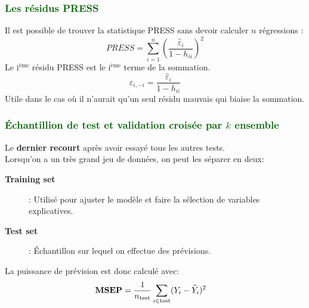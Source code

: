 \documentclass[10pt, french]{article}
\begin{document}
\begin{multicols*}{3}
\subsubsection*{\textcolor{darkgreen}{Les résidus PRESS}}
Il est possible de trouver la statistique PRESS sans devoir calculer $n$ régressions :
	\[ PRESS = \sum_{i=1}^n \left( \frac{\hat{\varepsilon}_i}{1 - h_{ii}} \right)^2 \]
	Le i$^{\text{ème}}$ résidu PRESS est le i$^{\text{ème}}$ terme de la sommation. 
	\[
	\widehat{\varepsilon}_{i, -i} = \frac{\widehat{\varepsilon}_{i}}{1 - h_{ii}}
	\]	
Utile dans le cas où il n'aurait qu'un seul résidu mauvais qui biaise la sommation.

\subsubsection*{\textcolor{darkgreen}{Échantillion de test et validation croisée par $k$ ensemble}}
Le \textbf{dernier recourt} après avoir essayé tous les autres tests.\\
Lorsqu'on a un très grand jeu de données, on peut les séparer en deux: 
\begin{description}
	\item[\textbf{Training set}]: Utilisé pour ajuster le modèle et faire la sélection de variables explicatives.
	\item[\textbf{Test set}]: Échantillon sur lequel on effectue des prévisions.
\end{description}
La puissance de prévision est donc calculé avec:
\begin{align*}
	\text{\textbf{MSEP}} &= \frac{1}{n_{\text{test}}} \sum_{i \in \text{test}} (Y_{i} - \widehat{Y}_{i})^{2}
\end{align*}


\end{multicols*}
\end{document}
